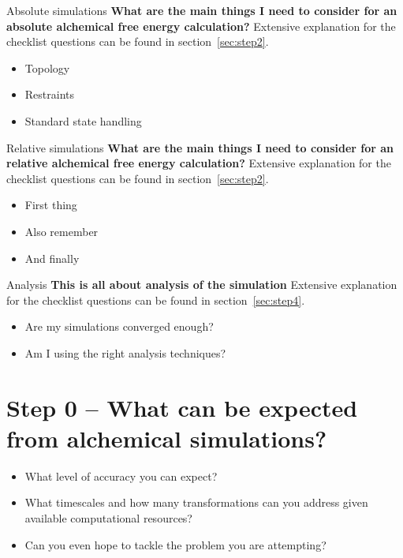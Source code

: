 \documentclass[9pt,bestpractices]{livecoms}
\begin{document}
\begin{Checklists*}[p!]
\begin{checklist}{Absolute simulations}
\textbf{What are the main things I need to consider for an absolute alchemical free energy calculation?}
Extensive explanation for the checklist questions can be found in section~\ref{sec:step2}.
\begin{itemize}
\item Topology
\item Restraints
\item Standard state handling
\end{itemize}
\end{checklist}

\begin{checklist}{Relative simulations}
\textbf{What are the main things I need to consider for an relative alchemical free energy calculation?}
Extensive explanation for the checklist questions can be found in section~\ref{sec:step2}.
\begin{itemize}
\item First thing
\item Also remember
\item And finally
\end{itemize}
\end{checklist}

\begin{checklist}{Analysis}
\textbf{This is all about analysis of the simulation}
Extensive explanation for the checklist questions can be found in section~\ref{sec:step4}.
\begin{itemize}
\item Are my simulations converged enough?
\item Am I using the right analysis techniques?
\end{itemize}
\end{checklist}

\end{Checklists*}
\clearpage

\section{Step 0 -- What can be expected from alchemical simulations?}
\label{sec:step0}
\begin{itemize}
\item What level of accuracy you can expect?
\item What timescales and how many transformations can you address given available computational resources?
\item Can you even hope to tackle the problem you are attempting?
\end{itemize}
\end{document}
